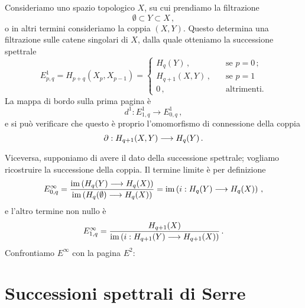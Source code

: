 


\begin{ex}
	Consideriamo uno spazio topologico $X$, su cui prendiamo la filtrazione
	\begin{equation*}
		\emptyset \subset Y \subset X\,,
	\end{equation*}
	o in altri termini consideriamo la coppia $(X,Y)$.
	Questo determina una filtrazione sulle catene singolari di $X$,
	dalla quale otteniamo la successione spettrale
	\begin{equation*}
		E^{1}_{p,q} = H_{p+q}(X_{p},X_{p-1}) = 
		\begin{cases}
			H_{q}(Y) \,, \quad &\text{se } p=0\,; \\
			H_{q+1}(X,Y) \,, \quad &\text{se } p=1\,\\
			0\,, \quad &\text{altrimenti.}
		\end{cases}
	\end{equation*}
	La mappa di bordo sulla prima pagina è
	\begin{equation*}
		d^{1}: E^{1}_{1,q} \longrightarrow E^{1}_{0,q}\,,
	\end{equation*}
	e si può verificare che questo è proprio l'omomorfismo di connessione della coppia
	\begin{equation*}
		\partial : H_{q+1}(X,Y) \longrightarrow H_{q}(Y)\,.
	\end{equation*}
	
	Viceversa, supponiamo di avere il dato della successione spettrale;
	vogliamo ricostruire la successione della coppia.
	Il termine limite è per definizione
	\begin{equation*}
		E^{\infty}_{0,q} =
		\frac{\operatorname{im} \left( H_{q}(Y) \longrightarrow H_{q}(X) \right)}{\operatorname{im} \left( H_{q}(\emptyset) \longrightarrow H_{q}(X) \right)}
		= \operatorname{im} \left( i: H_{q}(Y) \longrightarrow H_{q}(X) \right)\,,
	\end{equation*}
	e l'altro termine non nullo è
	\begin{equation*}
		E^{\infty}_{1,q} = \frac{H_{q+1}(X)}{\operatorname{im} \left( i: H_{q+1}(Y) \longrightarrow H_{q+1}(X) \right)}\,.
	\end{equation*}
	Confrontiamo $E^{\infty}$ con la pagina $E^{2}$:
\end{ex}




\section{Successioni spettrali di Serre}

